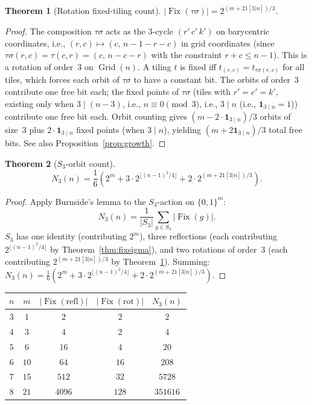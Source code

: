 \documentclass[12pt,reqno]{amsart}
\theoremstyle{plain}
\newtheorem{theorem}{Theorem}[section]
\theoremstyle{definition}
\theoremstyle{remark}
\DeclareMathOperator{\Fix}{Fix}
\DeclareMathOperator{\Grid}{Grid}
\newcommand{\indthree}{\mathbf{1}_{3\mid n}}
\renewcommand{\indthree}{1[3|n]}%
\begin{document}
\begin{theorem}[Rotation fixed-tiling count]\label{thm:fixrot}
$|\Fix(\tau\sigma)| = 2^{(m+2\indthree)/3}$.
\end{theorem}
\begin{proof}
The composition $\tau\sigma$ acts as the 3-cycle $(r'\,c'\,k')$ on barycentric
coordinates, i.e., $(r,c)\mapsto(c,\, n{-}1{-}r{-}c)$ in grid
coordinates (since $\tau\sigma(r,c) = \tau(c,r) = (c,\, n{-}c{-}r)$
with the constraint $r+c \le n-1$). This is a rotation of order~3 on
$\Grid(n)$. A tiling $t$ is fixed iff $t_{(r,c)} = t_{\tau\sigma(r,c)}$ for all
tiles, which forces each orbit of $\tau\sigma$ to have a constant bit. The orbits
of order~3 contribute one free bit each; the fixed points of $\tau\sigma$ (tiles
with $r'=c'=k'$, existing only when $3\mid(n-3)$, i.e., $n\equiv0\pmod3$,
i.e., $3\mid n$ (i.e., $\mathbf{1}_{3\mid n}=1$))
contribute one free bit each. Orbit counting gives $(m - 2\cdot\mathbf{1}_{3\mid n})/3$
orbits of size~3 plus $2\cdot\mathbf{1}_{3\mid n}$ fixed points (when $3\mid n$),
yielding $(m + 2\mathbf{1}_{3\mid n})/3$ total free bits. See also
Proposition~\ref{prop:growth}.
\end{proof}

\begin{theorem}[$S_3$-orbit count]\label{thm:burnside}
\[
  N_3(n) = \frac{1}{6}\!\left(2^m + 3\cdot 2^{\lfloor(n-1)^2/4\rfloor}
  + 2\cdot 2^{(m+2\indthree)/3}\right).
\]
\end{theorem}
\begin{proof}
Apply Burnside's lemma to the $S_3$-action on $\{0,1\}^m$:
\[N_3(n) = \frac{1}{|S_3|}\sum_{g\in S_3}|\Fix(g)|.\]
$S_3$ has one identity (contributing $2^m$), three reflections (each contributing
$2^{\lfloor(n-1)^2/4\rfloor}$ by Theorem~\ref{thm:fixsigma}), and two rotations
of order~3 (each contributing $2^{(m+2\indthree)/3}$ by Theorem~\ref{thm:fixrot}).
Summing: $N_3(n) = \frac{1}{6}(2^m + 3\cdot 2^{\lfloor(n-1)^2/4\rfloor} + 2\cdot 2^{(m+2\indthree)/3})$.
\end{proof}

\begin{center}
\small\renewcommand{\arraystretch}{1.18}
\begin{tabular}{ccccc}
\toprule
$n$ & $m$ & $|\Fix(\text{refl})|$ & $|\Fix(\text{rot})|$ & $N_3(n)$\\
\midrule
$3$ & $1$ & $2$ & $2$ & $2$\\
$4$ & $3$ & $4$ & $2$ & $4$\\
$5$ & $6$ & $16$ & $4$ & $20$\\
$6$ & $10$ & $64$ & $16$ & $208$\\
$7$ & $15$ & $512$ & $32$ & $5728$\\
$8$ & $21$ & $4096$ & $128$ & $351616$\\
\bottomrule
\end{tabular}
\end{center}
\end{document}
